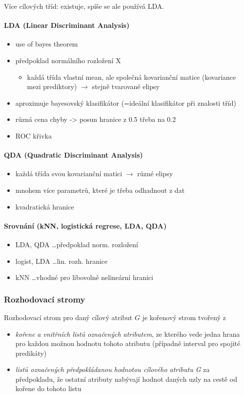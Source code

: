 \documentclass[11pt]{report} %
\numberwithin{equation}{section}
\begin{document}
	Více cílových tříd: existuje, spíše se ale používá LDA.

	\paragraph{LDA (Linear Discriminant Analysis)}
	\begin{itemize}
		\item use of bayes theorem
		\item předpoklad normálního rozložení X
		\begin{itemize} 
			\item každá třída vlastní mean, ale společná kovarianční matice (kovariance mezi prediktory) $\to$ stejně tvarované elipsy
		\end{itemize}
		\item aproximuje bayesovský klasifikátor (=ideální klasifikátor při znalosti tříd)
		\item různá cena chyby -\textgreater{} posun hranice z 0.5 třeba na 0.2
		\item ROC křivka
	\end{itemize}
	\paragraph{QDA (Quadratic Discriminant Analysis)}
	\begin{itemize}
		\item každá třída svou kovarianční matici $\to$ různé elipsy
		\item mnohem více parametrů, které je třeba odhadnout z dat 
		\item kvadratická hranice
	\end{itemize}
	
	\paragraph{Srovnání (kNN, logistická regrese, LDA, QDA)}
	\begin{itemize}	
		\item LDA, QDA \dots předpoklad norm. rozložení
		\item logist, LDA \dots lin. rozh. hranice
		\item kNN \dots vhodné pro libovolně nelineární hranici
	\end{itemize}


\subsubsection{Rozhodovací stromy}
Rozhodovací strom pro daný cílový atribut $G$ je kořenový strom tvořený z 
\begin{itemize}
	\item \textit{kořene a vnitřních listů označených atributem}, ze kterého vede jedna hrana pro každou možnou hodnotu tohoto atributu (případně interval pro spojité predikáty)
	\item \textit{listů označených předpokládanou hodnotou cílového atributu G} za předpokladu, že ostatní atributy nabývají hodnot daných uzly na cestě od kořene do tohoto listu
\end{itemize}
\end{document}
